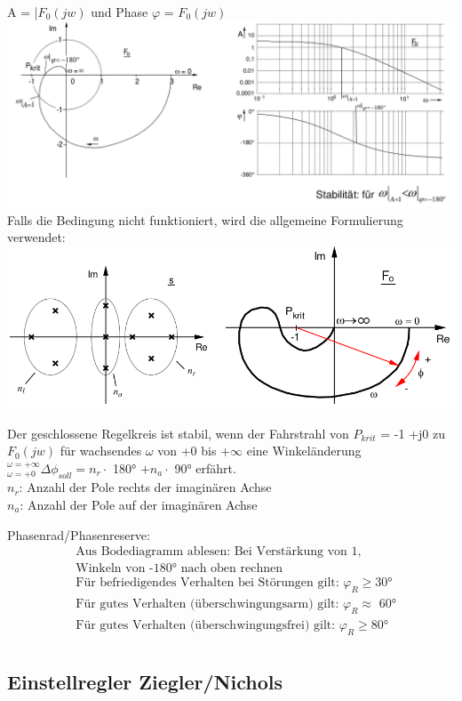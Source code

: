 \documentclass[10pt,a4paper]{article}
\begin{document}
    A = |$F_0 (jw)$ und Phase $\varphi$ = $F_0(jw)$\\
    \includegraphics[width=.5\textwidth]{Figures/Nyquist_Bode.png}
    Falls die Bedingung nicht funktioniert, wird die allgemeine Formulierung verwendet:\\
    \includegraphics[width=.5\textwidth]{Figures/Allgemein_Nyquist.png}
    \begin{mdframed}[style=exercise]
        Der geschlossene Regelkreis ist stabil, wenn der Fahrstrahl von $P_{krit}$ = -1 +j0
        zu $F_0 (jw)$ für wachsendes $\omega$ von +0 bis +$\infty$ eine Winkeländerung
        $^{\omega=+\infty}_{\omega=+0} \Delta \phi _{soll} = n_r \cdot$ 180° $+n_a \cdot$ 90°
        erfährt.\\
        $n_r$: Anzahl der Pole rechts der imaginären Achse\\
        $n_a$: Anzahl der Pole auf der imaginären Achse\\
    \end{mdframed}
    Phasenrad/Phasenreserve:
    \begin{align*}
        &\text{Aus Bodediagramm ablesen: Bei Verstärkung von 1,}\\
        &\text{Winkeln von -180° nach oben rechnen}\\
        &\text{Für befriedigendes Verhalten bei Störungen gilt: }\varphi _R \geq \text{30°}\\
        &\text{Für gutes Verhalten (überschwingungsarm) gilt: }\varphi _R \approx \text{ 60°}\\
        &\text{Für gutes Verhalten (überschwingungsfrei) gilt: }\varphi _R \geq \text{80°}\\
    \end{align*}

    \subsection{Einstellregler Ziegler/Nichols}
\end{document}
